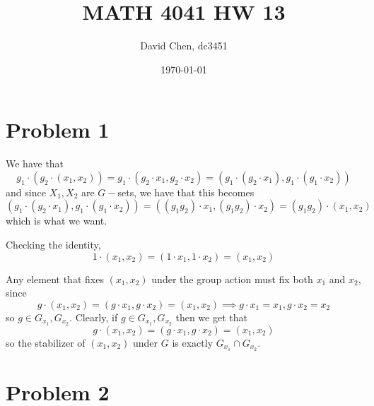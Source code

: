 \documentclass[12pt,letterpaper]{article}
\title{MATH 4041 HW 13}
\author{David Chen, dc3451}
\date{\today}
\theoremstyle{definition}
\begin{document}
\maketitle

\section*{Problem 1}

We have that
\[
  g_{1} \cdot (g_{2} \cdot (x_{1}, x_{2})) = g_{1} \cdot (g_{2} \cdot x_{1}, g_{2} \cdot x_{2}) = (g_{1} \cdot (g_{2} \cdot x_{1}), g_{1} \cdot (g_{1} \cdot x_{2}))
\]
and since $X_{1}, X_{2}$ are $G-$sets, we have that this becomes
\[
  (g_{1} \cdot (g_{2} \cdot x_{1}), g_{1} \cdot (g_{1} \cdot x_{2})) = ((g_{1}g_{2}) \cdot x_{1}, (g_{1}g_{2}) \cdot x_{2}) = (g_{1}g_{2}) \cdot (x_{1}, x_{2})
\]
which is what we want.

Checking the identity,
\[
  1 \cdot (x_{1}, x_{2}) = (1 \cdot x_{1}, 1 \cdot x_{2}) = (x_{1}, x_{2})
\]

Any element that fixes $(x_{1}, x_{2})$ under the group action must fix both $x_{1}$ and $x_{2}$, since
\[
  g \cdot (x_{1}, x_{2}) = (g \cdot x_{1}, g \cdot x_{2}) = (x_{1}, x_{2}) \implies g \cdot x_{1} = x_{1}, g\cdot x_{2} = x_{2}
\]
so $g \in G_{x_{1}}, G_{x_{2}}$. Clearly, if $g \in G_{x_{1}}, G_{x_{2}}$ then we get that
\[
  g \cdot (x_{1}, x_{2}) = (g \cdot x_{1}, g \cdot x_{2}) = (x_{1}, x_{2})
\]
so the stabilizer of $(x_{1}, x_{2})$ under $G$ is exactly $G_{x_{1}} \cap G_{x_{2}}$.

\section*{Problem 2}
\end{document}
